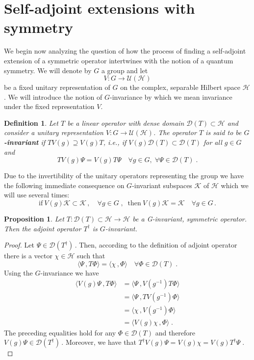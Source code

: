 \documentclass[a4paper,12pt]{amsart}
\newcommand{\scalar}[2]{\langle#1\,,#2\rangle}
\renewcommand{\H}{\mathcal{H}}
\newcommand{\D}{\mathcal{D}}
\newcommand{\1}{\mathbb{I}}
\newtheorem{proposition}[theorem]{Proposition}
\newtheorem{definition}[theorem]{Definition}
\numberwithin{equation}{section}
\numberwithin{theorem}{section}
\begin{document}

\section{Self-adjoint extensions with symmetry}
\label{sec:vonNeumannSymmetry}

We begin now analyzing the question of how the process of finding a self-adjoint extension of a symmetric operator
intertwines with the notion of a quantum symmetry. We will denote by $G$ a group and let
\[
  V\colon G\to\mathcal{U}(\mathcal{H})
\]
be a fixed unitary representation of $G$ on the complex, separable Hilbert space $\mathcal H$. We will introduce the notion
of $G$-invariance by which we mean invariance under the fixed representation $V$.


\begin{definition}\label{def:G-inv}
Let $T$ be a linear operator with dense domain $\D(T)\subset\mathcal{H}$ and consider a unitary
representation $V\colon G\to\mathcal{U}(\H)$.
The operator $T$ is said to be \textbf{$G$-invariant} if
$TV(g)\supseteq V(g)T$,
i.e., if $V(g)\D(T)\subset\D(T)$ for all $g\in G$ and
$$T {V(g)}\Psi=V(g) T \Psi \quad \forall g\in G,\;\forall \Psi\in\D(T)\;.$$
\end{definition}

Due to the invertibility of the unitary operators representing the group we have the following
immediate consequence on $G$-invariant subspaces $\mathcal K$ of $\H$ which we will use several times:
\begin{equation} \label{subsetequal}
\mathrm{if}~V(g)\mathcal{K}\subset\mathcal{K}\,,\quad \forall g\in G\;,\;\;\mathrm{then~} V(g)\mathcal{K}=\mathcal{K}\quad \forall g\in G\,.
\end{equation}


\begin{proposition}\label{adjointinvariant}
Let $T\colon\D(T)\subset\H\to\H$ be a  G-invariant, symmetric operator. Then the adjoint operator $T^{\dagger}$ is $G$-invariant.
\end{proposition}

\begin{proof}
Let $\Psi\in\D(T^\dagger)$\,. Then, according to the definition of adjoint operator there is a
vector $\chi\in\H$ such that
$$\scalar{\Psi}{T\Phi}=\scalar{\chi}{\Phi}\quad \forall \Phi\in\D(T)\;.$$
Using the $G$-invariance we have
\begin{align*}
\scalar{V(g)\Psi}{T\Phi}&=\scalar{\Psi}{V(g^{-1})T\Phi}\\
&=\scalar{\Psi}{TV(g^{-1})\Phi}\\
&=\scalar{\chi}{V(g^{-1})\Phi}\\
&=\scalar{V(g)\chi}{\Phi}\;.
\end{align*}
The preceding equalities hold for any $\Phi\in\D(T)$ and therefore $V(g)\Psi\in\D(T^\dagger)$\,.
Moreover, we have that $T^\dagger V(g)\Psi=V(g)\chi=V(g)T^\dagger \Psi\;.$
\end{proof}
\end{document}
